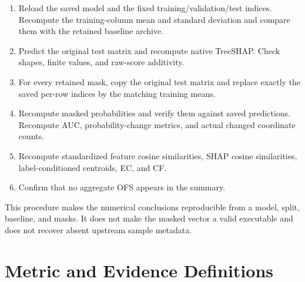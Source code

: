 \begin{enumerate}
    \item Reload the saved model and the fixed training/validation/test indices.
    Recompute the training-column mean and standard deviation and compare them
    with the retained baseline archive.
    \item Predict the original test matrix and recompute native TreeSHAP. Check
    shapes, finite values, and raw-score additivity.
    \item For every retained mask, copy the original test matrix and replace
    exactly the saved per-row indices by the matching training means.
    \item Recompute masked probabilities and verify them against saved
    predictions. Recompute AUC, probability-change metrics, and actual changed
    coordinate counts.
    \item Recompute standardized feature cosine similarities, SHAP cosine
    similarities, label-conditioned centroids, EC, and CF.
    \item Confirm that no aggregate OFS appears in the summary.
\end{enumerate}

This procedure makes the numerical conclusions reproducible from a model, split,
baseline, and masks. It does not make the masked vector a valid executable and
does not recover absent upstream sample metadata.

\section{Metric and Evidence Definitions}


